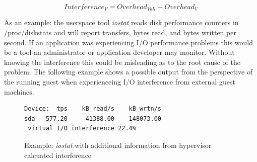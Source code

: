 \begin{equation}
Interference_V = Overhead_{Vall} - Overhead_V
\label{eq3}
\end{equation}

\indent As an example: the userspace tool \emph{iostat} reads disk performance counters in /proc/diskstats and will report transfers, bytes read, and bytes written per second.  If an application was experiencing I/O performance problems this would be a tool an administrator or application developer may monitor.  Without knowing the interference this could be misleading as to the root cause of the problem.  The following example shows a possible output from the perspective of the running guest when experienceing I/O interference from external guest machines.
\begin{figure}[h]
\begin{Verbatim}
Device:  tps    kB_read/s    kB_wrtn/s
sda   577.20     41388.00    148073.00
 virtual I/O interference 22.4%     
\end{Verbatim}
\label{fig:iostat}
\caption{Example:  \emph{iostat} with additional information from hypervisor calcuated interference}
\end{figure}

